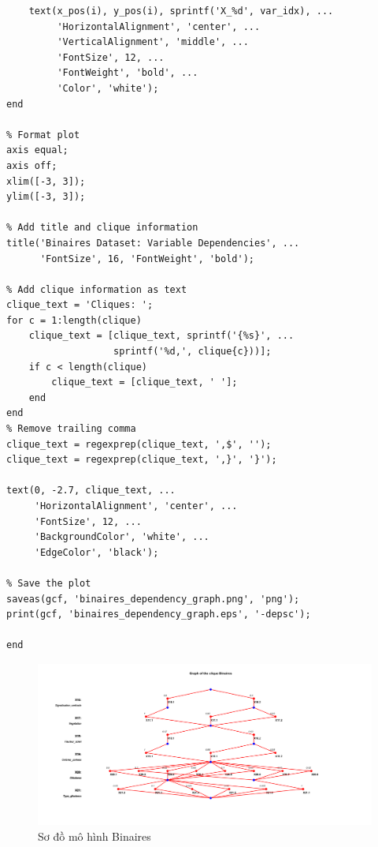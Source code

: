 \begin{matlab}
\begin{lstlisting}[caption={Hàm vẽ sơ đồ các mô hình độc lập hoặc phụ thuộc}]
    % Add variable label
    text(x_pos(i), y_pos(i), sprintf('X_%d', var_idx), ...
         'HorizontalAlignment', 'center', ...
         'VerticalAlignment', 'middle', ...
         'FontSize', 12, ...
         'FontWeight', 'bold', ...
         'Color', 'white');
end

% Format plot
axis equal;
axis off;
xlim([-3, 3]);
ylim([-3, 3]);

% Add title and clique information
title('Binaires Dataset: Variable Dependencies', ...
      'FontSize', 16, 'FontWeight', 'bold');

% Add clique information as text
clique_text = 'Cliques: ';
for c = 1:length(clique)
    clique_text = [clique_text, sprintf('{%s}', ...
                   sprintf('%d,', clique{c}))];
    if c < length(clique)
        clique_text = [clique_text, ' '];
    end
end
% Remove trailing comma
clique_text = regexprep(clique_text, ',$', '');
clique_text = regexprep(clique_text, ',}', '}');

text(0, -2.7, clique_text, ...
     'HorizontalAlignment', 'center', ...
     'FontSize', 12, ...
     'BackgroundColor', 'white', ...
     'EdgeColor', 'black');

% Save the plot
saveas(gcf, 'binaires_dependency_graph.png', 'png');
print(gcf, 'binaires_dependency_graph.eps', '-depsc');

end
\end{lstlisting}
\end{matlab}

\begin{figure}[h!]
    \centering
    \includegraphics[width=1.2\linewidth]{../../assets/images/fig_Binaires.png}
    \caption{Sơ đồ mô hình Binaires}
    \label{fig:Binaires}
\end{figure}

